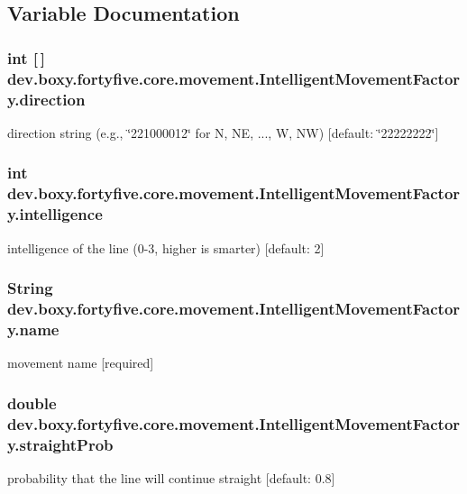 \subsection{Variable Documentation}
\hypertarget{group___intelligent_movement_ga6b8b74cf3c1bd96c164971c71ce7a2ca}{
\subsubsection[{direction}]{\setlength{\rightskip}{0pt plus 5cm}int \mbox{[}$\,$\mbox{]} {\bf dev.boxy.fortyfive.core.movement.IntelligentMovementFactory.direction}}}
\label{db/d13/group___intelligent_movement_ga6b8b74cf3c1bd96c164971c71ce7a2ca}
direction string (e.g., \char`\"{}221000012\char`\"{} for N, NE, ..., W, NW) \mbox{[}default: \char`\"{}22222222\char`\"{}\mbox{]} \hypertarget{group___intelligent_movement_ga9b0e82846a0b0570d87fd50d9c979968}{
\subsubsection[{intelligence}]{\setlength{\rightskip}{0pt plus 5cm}int {\bf dev.boxy.fortyfive.core.movement.IntelligentMovementFactory.intelligence}}}
\label{db/d13/group___intelligent_movement_ga9b0e82846a0b0570d87fd50d9c979968}
intelligence of the line (0-\/3, higher is smarter) \mbox{[}default: 2\mbox{]} \hypertarget{group___intelligent_movement_gadc27ef2838bc9382f21b3ffc79d89404}{
\subsubsection[{name}]{\setlength{\rightskip}{0pt plus 5cm}String {\bf dev.boxy.fortyfive.core.movement.IntelligentMovementFactory.name}}}
\label{db/d13/group___intelligent_movement_gadc27ef2838bc9382f21b3ffc79d89404}
movement name \mbox{[}required\mbox{]} \hypertarget{group___intelligent_movement_ga4cd10d785da44dfc2460c4ea999adcc1}{
\subsubsection[{straightProb}]{\setlength{\rightskip}{0pt plus 5cm}double {\bf dev.boxy.fortyfive.core.movement.IntelligentMovementFactory.straightProb}}}
\label{db/d13/group___intelligent_movement_ga4cd10d785da44dfc2460c4ea999adcc1}
probability that the line will continue straight \mbox{[}default: 0.8\mbox{]} 
